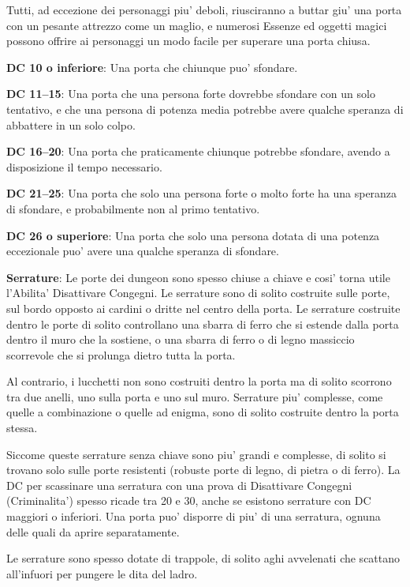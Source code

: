 \documentclass[a4paper,11pt,twoside,openany]{book}
\begin{document}
{		Tutti, ad eccezione dei personaggi piu' deboli, riusciranno a buttar giu' una porta con un pesante attrezzo come un maglio, e numerosi Essenze ed oggetti magici possono offrire ai personaggi un modo facile per superare una porta chiusa.
		
		\textbf{DC 10 o inferiore}: Una porta che chiunque puo' sfondare.
		
		\textbf{DC 11--15}: Una porta che una persona forte dovrebbe sfondare con un solo tentativo, e che una persona di potenza media potrebbe avere qualche speranza di abbattere in un solo colpo.
		
		\textbf{DC 16--20}: Una porta che praticamente chiunque potrebbe sfondare, avendo a disposizione il tempo necessario. 
		
		\textbf{DC 21--25}: Una porta che solo una persona forte o molto forte ha una speranza di sfondare, e probabilmente non al primo tentativo. 
		
		\textbf{DC 26 o superiore}: Una porta che solo una persona dotata di una potenza eccezionale puo' avere una qualche speranza di sfondare.
		
		\textbf{Serrature}: Le porte dei dungeon sono spesso chiuse a chiave e cosi' torna utile l'Abilita' Disattivare Congegni. Le serrature sono di solito costruite sulle porte, sul bordo opposto ai cardini o dritte nel centro della porta. Le serrature costruite dentro le porte di solito controllano una sbarra di ferro che si estende dalla porta dentro il muro che la sostiene, o una sbarra di ferro o di legno massiccio scorrevole che si prolunga dietro tutta la porta. 
		
		Al contrario, i lucchetti non sono costruiti dentro la porta ma di solito scorrono tra due anelli, uno sulla porta e uno sul muro. Serrature piu' complesse, come quelle a combinazione o quelle ad enigma, sono di solito costruite dentro la porta stessa. 
		
		Siccome queste serrature senza chiave sono piu' grandi e complesse, di solito si trovano solo sulle porte resistenti (robuste porte di legno, di pietra o di ferro). 
		La DC per scassinare una serratura con una prova di Disattivare Congegni (Criminalita') spesso ricade tra 20 e 30, anche se esistono serrature con DC maggiori o inferiori. Una porta puo' disporre di piu' di una serratura, ognuna delle quali da aprire separatamente.
		
		Le serrature sono spesso dotate di trappole, di solito aghi avvelenati che scattano all'infuori per pungere le dita del ladro.
		
}
\end{document}
